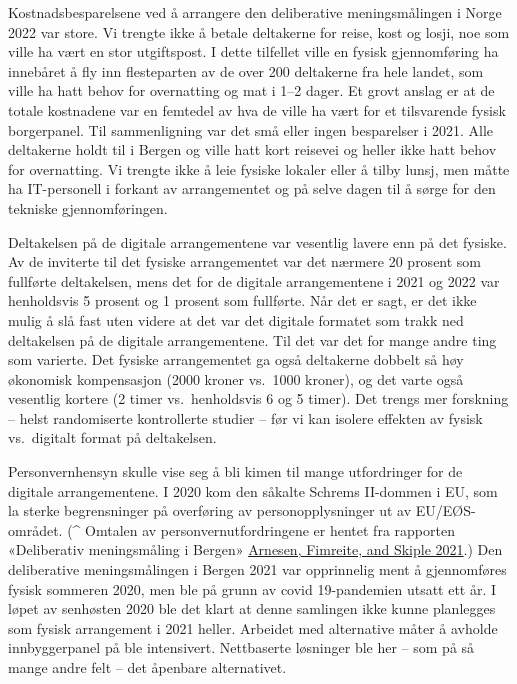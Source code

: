 \documentclass[
  12pt,
  a4paper, 12pt]{article}
\begin{document}
Kostnadsbesparelsene ved å arrangere den deliberative meningsmålingen i Norge 2022 var store. Vi trengte ikke å betale deltakerne for reise, kost og losji, noe som ville ha vært en stor utgiftspost. I dette tilfellet ville en fysisk gjennomføring ha innebåret å fly inn flesteparten av de over 200 deltakerne fra hele landet, som ville ha hatt behov for overnatting og mat i 1--2 dager. Et grovt anslag er at de totale kostnadene var en femtedel av hva de ville ha vært for et tilsvarende fysisk borgerpanel. Til sammenligning var det små eller ingen besparelser i 2021. Alle deltakerne holdt til i Bergen og ville hatt kort reisevei og heller ikke hatt behov for overnatting. Vi trengte ikke å leie fysiske lokaler eller å tilby lunsj, men måtte ha IT-personell i forkant av arrangementet og på selve dagen til å sørge for den tekniske gjennomføringen.

Deltakelsen på de digitale arrangementene var vesentlig lavere enn på det fysiske. Av de inviterte til det fysiske arrangementet var det nærmere 20 prosent som fullførte deltakelsen, mens det for de digitale arrangementene i 2021 og 2022 var henholdsvis 5 prosent og 1 prosent som fullførte. Når det er sagt, er det ikke mulig å slå fast uten videre at det var det digitale formatet som trakk ned deltakelsen på de digitale arrangementene. Til det var det for mange andre ting som varierte. Det fysiske arrangementet ga også deltakerne dobbelt så høy økonomisk kompensasjon (2000 kroner vs.~1000 kroner), og det varte også vesentlig kortere (2 timer vs.~henholdsvis 6 og 5 timer). Det trengs mer forskning -- helst randomiserte kontrollerte studier -- før vi kan isolere effekten av fysisk vs.~digitalt format på deltakelsen.

Personvernhensyn skulle vise seg å bli kimen til mange utfordringer for de digitale arrangementene. I 2020 kom den såkalte Schrems II-dommen i EU, som la sterke begrensninger på overføring av personopplysninger ut av EU/EØS-området. (\^{} Omtalen av personvernutfordringene er hentet fra rapporten «Deliberativ meningsmåling i Bergen» \protect\hyperlink{ref-arnesendelib2021}{Arnesen, Fimreite, and Skiple 2021}.) Den deliberative meningsmålingen i Bergen 2021 var opprinnelig ment å gjennomføres fysisk sommeren 2020, men ble på grunn av covid 19-pandemien utsatt ett år. I løpet av senhøsten 2020 ble det klart at denne samlingen ikke kunne planlegges som fysisk arrangement i 2021 heller. Arbeidet med alternative måter å avholde innbyggerpanel på ble intensivert. Nettbaserte løsninger ble her -- som på så mange andre felt -- det åpenbare alternativet.
\end{document}
